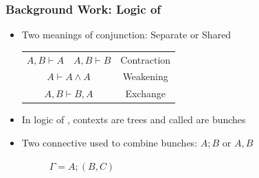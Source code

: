 \begin{frame}[c]
  \frametitle{Background Work: Logic of \BI{}}
  \begin{center}
    \begin{itemize}

    \item Two meanings of conjunction: Separate or Shared

        \begin{tabular}[h]{c c c}
          $A, B \vdash A$ &  $A, B \vdash B$   & Contraction \\

          \multicolumn{2}{c}{$A \vdash A \wedge A$} & Weakening \\

          \multicolumn{2}{c}{$A, B \vdash B, A$} & Exchange
        \end{tabular}

      \item In logic of \BI{}, contexts are trees and called are bunches
    \item Two connective used to combine bunches: $A;B$ or $A, B$\\
      \begin{center}
        \begin{figure}[h]\centering
      \begin{minipage}{0.5\linewidth}\centering
        \caption*{$\Gamma = (A;B),C$}
      \end{minipage}%
      \begin{minipage}{0.5\linewidth}\centering
        \caption*{$\Gamma = A;(B,C)$}
      \end{minipage}
    \end{figure}

    \end{center}

\end{itemize}
\end{center}
\end{frame}

